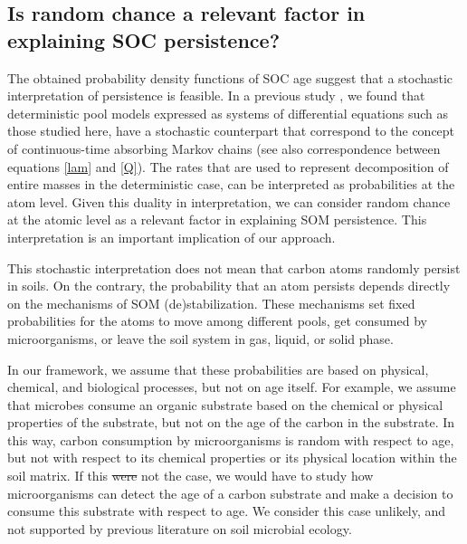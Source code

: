 \documentclass[draft,linenumbers]{agujournal}
\providecommand{\DIFadd}[1]{{\protect\color{blue}\uwave{#1}}} %
\providecommand{\DIFdel}[1]{{\protect\color{red}\sout{#1}}}                      %
\providecommand{\DIFaddbegin}{} %
\providecommand{\DIFaddend}{} %
\providecommand{\DIFdelbegin}{} %
\providecommand{\DIFdelend}{} %
\begin{document}
\subsection{Is random chance a relevant factor in explaining SOC persistence?}
The obtained probability density functions of SOC age suggest that a stochastic interpretation of persistence is feasible. In a previous study \citep{Metzler2018MG}, we found that deterministic pool models expressed as systems of differential equations such as those studied here, have a stochastic counterpart that correspond to the concept of continuous-time absorbing Markov chains (see also correspondence between equations \ref{lam} and \ref{Q}). The rates that are used to represent decomposition of entire masses in the deterministic case, can be interpreted as probabilities at the atom level. Given this duality in interpretation, we can consider random chance at the atomic level as a relevant factor in explaining SOM persistence. This interpretation is an important implication of our approach. 

This stochastic interpretation does not mean that carbon atoms randomly persist in soils. On the contrary, the probability that an atom persists depends directly on the mechanisms of SOM (de)stabilization. These mechanisms set fixed probabilities for the atoms to move among different pools, \DIFaddbegin \DIFadd{to }\DIFaddend get consumed by microorganisms, or \DIFaddbegin \DIFadd{to }\DIFaddend leave the soil system in gas, liquid, or solid phase. 

In our framework, we assume that these probabilities are based on physical, chemical, and biological processes, but not on age itself. For example, we assume that microbes consume an organic substrate based on the chemical or physical properties of the substrate, but not on the age of the carbon in the substrate. In this way, carbon consumption by microorganisms is random with respect to age, but not with respect to its chemical properties or its physical location within the soil matrix.  If this \DIFdelbegin \DIFdel{were }\DIFdelend \DIFaddbegin \DIFadd{is }\DIFaddend not the case, we would have to study how microorganisms can detect the age of a carbon substrate and make a decision to consume this substrate with respect to age. We consider this case unlikely, and not supported by previous literature on soil microbial ecology.
\end{document}
